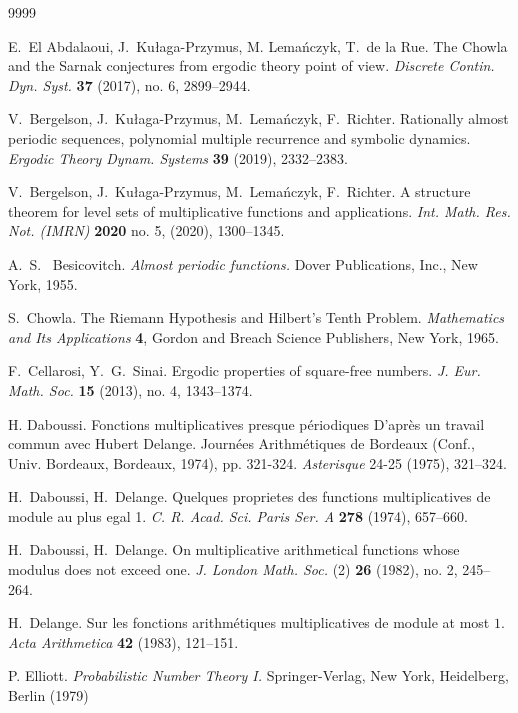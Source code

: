 \documentclass[11pt]{amsart}
\theoremstyle{definition}
\begin{document}
\begin{thebibliography}{9999}
	
 E.~El Abdalaoui, J.~Ku{\l}aga-Przymus, M. Lema\'nczyk, T.~de la Rue. The Chowla and the Sarnak conjectures from ergodic theory point of view.
	{\em Discrete Contin. Dyn. Syst.}
	{\bf 37} (2017), no. 6, 2899--2944.
	
 V.~Bergelson, J.~Ku{\l}aga-Przymus, M.~Lema\'nczyk, F.~Richter. Rationally almost periodic sequences, polynomial multiple recurrence and symbolic dynamics. {\em  Ergodic Theory Dynam. Systems}  \textbf{39} (2019), 2332--2383.

 V.~Bergelson, J.~Ku{\l}aga-Przymus, M.~Lema\'nczyk, F.~Richter. A structure theorem for level sets of multiplicative functions and  applications.
	{\em Int. Math. Res. Not. (IMRN)}   {\bf 2020} no. 5, (2020), 1300--1345.

 A.~S.~ Besicovitch. {\em Almost periodic functions.} Dover Publications, Inc., New York, 1955.
	
		 S.~Chowla. The Riemann Hypothesis and Hilbert’s Tenth Problem. {\em Mathematics and Its
		Applications} {\bf 4},  Gordon and Breach Science Publishers, New York, 1965.
	
	
	F.~Cellarosi, Y.~G.~Sinai. Ergodic properties of square-free numbers. {\em  J. Eur.
		Math. Soc.} {\bf 15} (2013), no. 4, 1343--1374.
	
  H. Daboussi. Fonctions multiplicatives presque p\'eriodiques  D'apr\`es un travail commun avec Hubert Delange. Journ\'ees Arithm\'etiques de Bordeaux (Conf., Univ. Bordeaux, Bordeaux, 1974), pp. 321-324. {\em Asterisque} 24-25 (1975), 321--324.
	
	  H.~Daboussi, H.~Delange. Quelques proprietes des functions multiplicatives de module au plus egal 1. {\em C. R. Acad. Sci. Paris Ser. A} {\bf 278} (1974),
	 657--660.
	
	  H.~Daboussi, H.~Delange.
	 On multiplicative arithmetical functions whose modulus does not exceed one.
	 {\em J. London Math. Soc.} (2) {\bf 26} (1982), no. 2, 245--264.
	
	 H.~Delange. Sur les fonctions arithm\'etiques multiplicatives de module at most $1$. {\em Acta Arithmetica} \textbf{42} (1983), 121--151.
	
	P. Elliott. {\em Probabilistic Number Theory I.} Springer-Verlag, New York, Heidelberg, Berlin (1979)


\end{thebibliography}
\end{document}
